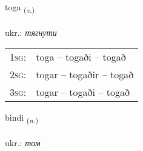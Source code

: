 \documentclass[frontgrid, backgrid]{flacards}\usepackage[]{graphicx}\usepackage[]{xcolor}
\begin{document}
\renewcommand{\flhead}{\vskip5pt \fboxsep=0pt {\small\bfseries\footnotesize Sagnorð | дієслово}}
\renewcommand{\fcfoot}{\vskip5pt \fboxsep=0pt \hspace{2pt}{\small\bfseries\footnotesize 3K}}

\renewcommand{\blhead}{\vskip5pt {\small\bfseries\footnotesize Sagnorð | дієслово }}
\renewcommand{\bcfoot}{\vskip5pt \hspace{2pt}{\small\bfseries\footnotesize 3K}}


{toga \small{\textsubscript{(\textit{v.})}} \\[1ex] %
\textphonetic{[tʰɔːɣa]} \\
ukr.: \emph{тягнути} \\  [2ex]
\renewcommand*{\arraystretch}{0.8}
\begin{tabular}{p{1cm}l}
\textsc{1sg}: & toga -- togaði -- togað \\ 
\textsc{2sg}: & togar -- togaðir -- togað \\ 
\textsc{3sg}: & togar -- togaði -- togað \\ 
\end{tabular}
}

\renewcommand{\flhead}{\vskip5pt \fboxsep=0pt {\small\bfseries\footnotesize Nafnorð | іменник}}
\renewcommand{\fcfoot}{\vskip5pt \fboxsep=0pt \hspace{2pt}{\small\bfseries\footnotesize 3K}}

\renewcommand{\blhead}{\vskip5pt {\small\bfseries\footnotesize Nafnorð | іменник }}
\renewcommand{\bcfoot}{\vskip5pt \hspace{2pt}{\small\bfseries\footnotesize 3K}}


{bindi \small{\textsubscript{(\textit{n.})}} \\[1ex] %
\textphonetic{[pɪntɪ]} \\
ukr.: \emph{том} \\  [2ex]
\renewcommand*{\arraystretch}{0.8}
}
\end{document}
